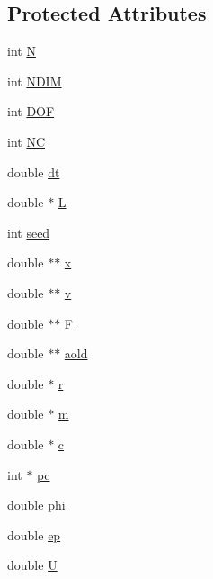 \subsection*{Protected Attributes}
\begin{DoxyCompactItemize}
\item 
int \mbox{\hyperlink{classpacking_a282fd04f2195ce1535ef9a1eb0c3af40}{N}}
\item 
int \mbox{\hyperlink{classpacking_a43d0d9d087ec30c847e89b5002e422d4}{N\+D\+IM}}
\item 
int \mbox{\hyperlink{classpacking_a154fee4288694b65d28f5d904b1784b6}{D\+OF}}
\item 
int \mbox{\hyperlink{classpacking_ad09604fb221c69596a95083c1c8c7d47}{NC}}
\item 
double \mbox{\hyperlink{classpacking_a61dd57ff727cdffa0573189b14a372d3}{dt}}
\item 
double $\ast$ \mbox{\hyperlink{classpacking_ae4a6707ea8b2af01eda36ea9d230259e}{L}}
\item 
int \mbox{\hyperlink{classpacking_aa5a588c50b2c22b3c2917a2da12f33e5}{seed}}
\item 
double $\ast$$\ast$ \mbox{\hyperlink{classpacking_a3b56d5b429817628d1cd764f4a62827d}{x}}
\item 
double $\ast$$\ast$ \mbox{\hyperlink{classpacking_a25a8813f1efa77beae413fe335bec3a7}{v}}
\item 
double $\ast$$\ast$ \mbox{\hyperlink{classpacking_a39113604e4ffe9563e79e8289e6eed61}{F}}
\item 
double $\ast$$\ast$ \mbox{\hyperlink{classpacking_a16ab3555506f30e4848ca52ae1136444}{aold}}
\item 
double $\ast$ \mbox{\hyperlink{classpacking_a3e301d8084ada7f0258b80639fa83c88}{r}}
\item 
double $\ast$ \mbox{\hyperlink{classpacking_ab06bef3feef42f5c48c39fa1ae297e23}{m}}
\item 
double $\ast$ \mbox{\hyperlink{classpacking_a01db0c365f0f66bbc2de30fed7e1881a}{c}}
\item 
int $\ast$ \mbox{\hyperlink{classpacking_abbc23675b258dfad02a53e578c1e4589}{pc}}
\item 
double \mbox{\hyperlink{classpacking_a951a89b6ca12a40cb60344752bd8d817}{phi}}
\item 
double \mbox{\hyperlink{classpacking_a1c04efa5180dbc7100daa11b1b0728f7}{ep}}
\item 
double \mbox{\hyperlink{classpacking_a4412ad37535700fcf62fb9e3d87c2c49}{U}}
\item 

\end{DoxyCompactItemize}
